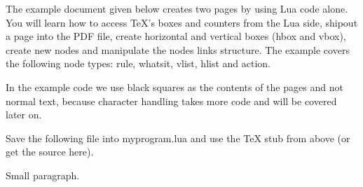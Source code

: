\documentclass[draft]{article}
\begin{document}
The example document given below creates two pages by using Lua code alone. You
will learn how to access TeX's boxes and counters from the Lua side, shipout a
page into the PDF file, create horizontal and vertical boxes (hbox and vbox),
create new nodes and manipulate the nodes links structure. The example covers
the following node types: rule, whatsit, vlist, hlist and action.

In the example code we use black squares as the contents of the pages and not
normal text, because character handling takes more code and will be covered
later on.

Save the following file into myprogram.lua and use the TeX stub from above (or
get the source here). 

Small paragraph.
\end{document}
